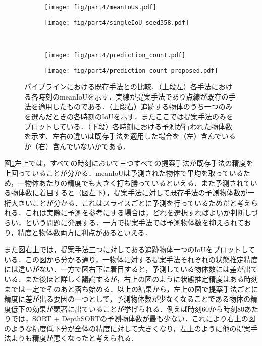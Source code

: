 \begin{figure}[t]
    \begin{subfigure}[t]{0.5\linewidth}
        \centering
        \texttt{[image: fig/part4/meanIoUs.pdf]}
    \end{subfigure}
    \hfill
    \begin{subfigure}[t]{.5\linewidth}
        \centering
        \texttt{[image: fig/part4/singleIoU\_seed358.pdf]}
    \end{subfigure}
    \\    
    \begin{subfigure}[t]{0.5\linewidth}
        \centering
        \texttt{[image: fig/part4/prediction\_count.pdf]} 
    \end{subfigure}
    \hfill
    \begin{subfigure}[t]{.5\linewidth}
        \centering
        \texttt{[image: fig/part4/prediction\_count\_proposed.pdf]}
    \end{subfigure}
    \vspace{-3zh}
    \caption[パイプラインにおける既存手法との比較]{パイプラインにおける既存手法との比較．（上段左）各手法における各時刻のmeanIoUを示す．実線が提案手法であり点線が既存の手法を適用したものである．（上段右）追跡する物体のうち一つのみを選んだときの各時刻のIoUを示す．またここでは提案手法のみをプロットしている．（下段）各時刻における予測が行われた物体数を示す．左右の違いは既存手法を適用した場合を（左）含んでいるか（右）含んでいないかである．}
    \label{fig:pipeline_assessment}
\end{figure}

図\ref{fig:pipeline_assessment}左上では，すべての時刻において三つすべての提案手法が既存手法の精度を上回っていることが分かる．meanIoUは予測された物体で平均を取っているため，一物体あたりの精度でも大きく打ち勝っているといえる．また予測されている物体数に着目すると（図左下），提案手法に対して既存手法の予測物体数が一桁大きいことが分かる．これはスライスごとに予測を行っているためだと考えられる．これは実際に予測を参考にする場合は，どれを選択すればよいか判断しづらい，という問題に発展する．一方で提案手法では予測物体数を抑えられており，精度と物体数両方に利点があるといえる．

また図右上では，提案手法三つに対してある追跡物体一つのIoUをプロットしている．この図から分かる通り，一物体に対する提案手法それぞれの状態推定精度には違いがない．一方で図右下に着目すると，予測している物体数には差が出ている．また後ほど詳しく議論するが，右上の図のように状態推定精度はある時刻までは一定でそのあと落ち始める．以上の結果から，左上の図で提案手法ごとに精度に差が出る要因の一つとして，予測物体数が少なくなることである物体の精度低下の効果が顕著に出ていることが挙げられる．例えば時刻$60$から時刻$80$あたりでは，SORT + DepthSORTの予測物体数が最も少ない．これにより右上の図のような精度低下分が全体の精度に対して大きくなり，左上のように他の提案手法よりも精度が悪くなったと考えられる．

